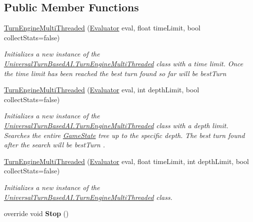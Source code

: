 \subsection*{Public Member Functions}
\begin{DoxyCompactItemize}
\item 
\hyperlink{class_universal_turn_based_a_i_1_1_turn_engine_multi_threaded_a532f4a7c6111b49ef0af0c0eabaa7bd5}{Turn\+Engine\+Multi\+Threaded} (\hyperlink{class_universal_turn_based_a_i_1_1_evaluator}{Evaluator} eval, float time\+Limit, bool collect\+Stats=false)
\begin{DoxyCompactList}\small\item\em Initializes a new instance of the \hyperlink{class_universal_turn_based_a_i_1_1_turn_engine_multi_threaded}{Universal\+Turn\+Based\+A\+I.\+Turn\+Engine\+Multi\+Threaded} class with a time limit. Once the time limit has been reached the best turn found so far will be {\itshape best\+Turn}  \end{DoxyCompactList}\item 
\hyperlink{class_universal_turn_based_a_i_1_1_turn_engine_multi_threaded_ac2a5c6ac3c579c3fe4f53845480e37d4}{Turn\+Engine\+Multi\+Threaded} (\hyperlink{class_universal_turn_based_a_i_1_1_evaluator}{Evaluator} eval, int depth\+Limit, bool collect\+Stats=false)
\begin{DoxyCompactList}\small\item\em Initializes a new instance of the \hyperlink{class_universal_turn_based_a_i_1_1_turn_engine_multi_threaded}{Universal\+Turn\+Based\+A\+I.\+Turn\+Engine\+Multi\+Threaded} class with a depth limit. Searches the entire \hyperlink{class_universal_turn_based_a_i_1_1_game_state}{Game\+State} tree up to the specific depth. The best turn found after the search will be {\itshape best\+Turn} . \end{DoxyCompactList}\item 
\hyperlink{class_universal_turn_based_a_i_1_1_turn_engine_multi_threaded_a8ddc2a8baa309367b57f352c92d5abf4}{Turn\+Engine\+Multi\+Threaded} (\hyperlink{class_universal_turn_based_a_i_1_1_evaluator}{Evaluator} eval, float time\+Limit, int depth\+Limit, bool collect\+Stats=false)
\begin{DoxyCompactList}\small\item\em Initializes a new instance of the \hyperlink{class_universal_turn_based_a_i_1_1_turn_engine_multi_threaded}{Universal\+Turn\+Based\+A\+I.\+Turn\+Engine\+Multi\+Threaded} class. \end{DoxyCompactList}\item 
\hypertarget{class_universal_turn_based_a_i_1_1_turn_engine_multi_threaded_a01bed3edbbe50d06f06e68b52af13c9c}{}override void {\bfseries Stop} ()\label{class_universal_turn_based_a_i_1_1_turn_engine_multi_threaded_a01bed3edbbe50d06f06e68b52af13c9c}

\end{DoxyCompactItemize}
